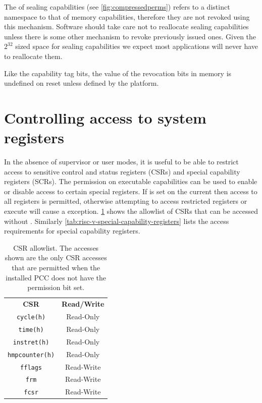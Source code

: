 The \cbase{} of sealing capabilities (see \cref{fig:compressedperms}) refers to a distinct namespace to that of memory capabilities, therefore they are not revoked using this mechanism.
Software should take care not to reallocate sealing capabilities unless there is some other mechanism to revoke previously issued ones.
Given the $2^{32}$ sized space for sealing capabilities we expect most applications will never have to reallocate them.

Like the capability tag bits, the value of the revocation bits in memory is undefined on reset unless defined by the platform.

\section{Controlling access to system registers}
\label{sec:asr}

In the absence of supervisor or user modes, it is useful to be able to restrict access to sensitive control and status registers (CSRs) and special capability registers (SCRs).
The \cappermASR{} permission on executable capabilities can be used to enable or disable access to certain special registers.
If \cappermASR{} is set on the current \PCC{} then access to all registers is permitted, otherwise attempting to access restricted registers or execute  will cause a \cappermASR{} exception.
\cref{tab:risc-v-access-system-registers-whitelist} shows the allowlist of CSRs that can be accessed without \cappermASR{}.
Similarly \cref{tab:risc-v-special-capability-registers} lists the access requirements for special capability registers.

\begin{table}[h!]
\centering
\begin{tabular}{cc}
\toprule
\textbf{CSR}           & \textbf{Read/Write} \\
\texttt{cycle(h)}      & Read-Only           \\
\texttt{time(h)}       & Read-Only           \\
\texttt{instret(h)}    & Read-Only           \\
\texttt{hmpcounter(h)} & Read-Only           \\
[1.5em]
\texttt{fflags}        & Read-Write          \\
\texttt{frm}           & Read-Write          \\
\texttt{fcsr}          & Read-Write          \\
\bottomrule
\end{tabular}
\caption{CSR allowlist. The accesses shown are the only CSR accesses that are permitted when the installed PCC does not have the \cappermASR{} permission bit set.}
\label{tab:risc-v-access-system-registers-whitelist}
\end{table}

